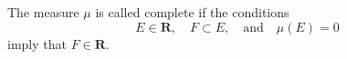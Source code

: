 The measure $\mu$ is called complete if the conditions
$$E \in \mathbf{R}, \quad F \subset E, \quad \text{and} \quad \mu(E) = 0$$
imply that $F \in \mathbf{R}$.
